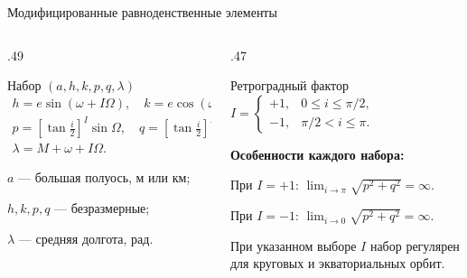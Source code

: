 \documentclass[11pt,aspectratio=169,t]{beamer}
\begin{document}
\begingroup
{}
\begin{frame}{Модифицированные равноденственные элементы}
\begin{columns}[T,onlytextwidth]
\begin{column}{.49\textwidth}
\begin{block}{Набор $(a,h,k,p,q,\lambda)$}
\centering
$\displaystyle
\begin{gathered}
h = e\sin(\omega+I\Omega),\quad
k = e\cos(\omega+I\Omega),\\[4pt]
p = \left[\tan\frac{i}{2}\right]^I\sin\Omega,\quad
q = \left[\tan\frac{i}{2}\right]^I\cos\Omega,\\[4pt]
\lambda = M+\omega+I\Omega.
\end{gathered}
$\par
\end{block}
$a$ --- большая полуось, м или км;\par
$h,k,p,q$ --- безразмерные;\par
$\lambda$ --- средняя долгота, рад.
\end{column}
\begin{column}{.47\textwidth}
\begin{block}{Ретроградный фактор}
\centering
$\displaystyle
I=\begin{cases}
+1,&0\le i\le\pi/2,\\
-1,&\pi/2<i\le\pi.
\end{cases}
$\par
\end{block}
\textbf{Особенности каждого набора:}\par\smallskip
При $I=+1$: $\displaystyle\lim_{i\to\pi}\sqrt{p^2+q^2}=\infty.$\par\smallskip
При $I=-1$: $\displaystyle\lim_{i\to0}\sqrt{p^2+q^2}=\infty.$\par\smallskip
При указанном выборе $I$ набор регулярен для круговых и экваториальных орбит.
\end{column}
\end{columns}
\end{frame}
\endgroup
\end{document}
